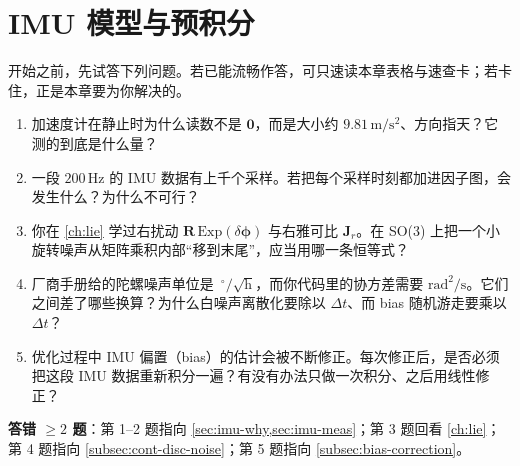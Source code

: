 \chapter{IMU 模型与预积分}
\label{ch:imu}


\begin{practice}[前置自测]
开始之前，先试答下列问题。若已能流畅作答，可只速读本章表格与速查卡；若卡住，正是本章要为你解决的。
\begin{enumerate}
  \item 加速度计在静止时为什么读数不是 $\mathbf 0$，而是大小约 $9.81\,\mathrm{m/s^2}$、方向指天？它测的到底是什么量？
  \item 一段 $200\,\mathrm{Hz}$ 的 IMU 数据有上千个采样。若把每个采样时刻都加进因子图，会发生什么？为什么不可行？
  \item 你在 \cref{ch:lie} 学过右扰动 $\mathbf R\,\mathrm{Exp}(\delta\boldsymbol\phi)$ 与右雅可比 $\mathbf J_r$。在 SO(3) 上把一个小旋转噪声从矩阵乘积内部“移到末尾”，应当用哪一条恒等式？
  \item 厂商手册给的陀螺噪声单位是 $\,^\circ/\sqrt{\mathrm h}$，而你代码里的协方差需要 $\mathrm{rad}^2/\mathrm s$。它们之间差了哪些换算？为什么白噪声离散化要除以 $\Delta t$、而 bias 随机游走要乘以 $\Delta t$？
  \item 优化过程中 IMU 偏置（bias）的估计会被不断修正。每次修正后，是否必须把这段 IMU 数据重新积分一遍？有没有办法只做一次积分、之后用线性修正？
\end{enumerate}
\textbf{答错 $\ge2$ 题}：第 1--2 题指向 \cref{sec:imu-why,sec:imu-meas}；第 3 题回看 \cref{ch:lie}；第 4 题指向 \cref{subsec:cont-disc-noise}；第 5 题指向 \cref{subsec:bias-correction}。
\end{practice}


